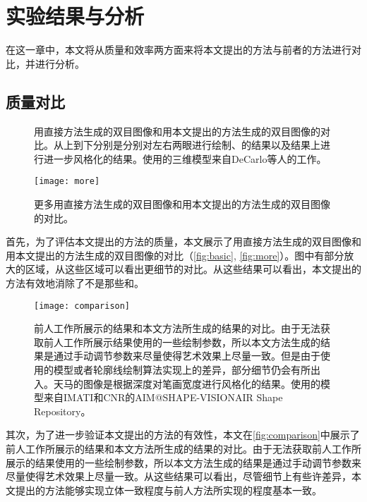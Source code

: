 \chapter{实验结果与分析}

在这一章中，本文将从质量和效率两方面来将本文提出的方法与前者的方法进行对比，并进行分析。

\section{质量对比}

\begin{figure}[tbh]
    \centering
    \caption{\label{fig:basic}
    用直接方法生成的双目图像和用本文提出的方法生成的双目图像的对比。从上到下分别是分别对左右两眼进行绘制、\stc{}的结果以及\stc{}结果上进行进一步风格化的结果。使用的三维模型来自DeCarlo等人的工作\cite{DFRS03}。
    }
\end{figure}
  
\begin{figure}[tbh]
    \centering
    \texttt{[image: more]}
    \caption{\label{fig:more}
    更多用直接方法生成的双目图像和用本文提出的方法生成的双目图像的对比。
    }
\end{figure}

首先，为了评估本文提出的方法的质量，本文展示了用直接方法生成的双目图像和用本文提出的方法生成的双目图像的对比（\autoref{fig:basic}, \autoref{fig:more}）。图中有部分放大的区域，从这些区域可以看出更细节的对比。从这些结果可以看出，本文提出的方法有效地消除了不是\stc{}那些\con{}和\scon{}。

\begin{figure}[tbh]
    \centering
    \texttt{[image: comparison]}
    \caption{\label{fig:comparison}
    前人工作\cite{kim2013stereoscopic,bukenberger2018stereo}所展示的结果和本文方法所生成的结果的对比。由于无法获取前人工作所展示结果使用的一些绘制参数，所以本文方法生成的结果是通过手动调节参数来尽量使得艺术效果上尽量一致。但是由于使用的模型或者轮廓线绘制算法实现上的差异，部分细节仍会有所出入。天马的图像是根据深度对笔画宽度进行风格化的结果。使用的模型来自IMATI和CNR的AIM@SHAPE-VISIONAIR Shape Repository\cite{INR04}。}
\end{figure}  

其次，为了进一步验证本文提出的方法的有效性，本文在\autoref{fig:comparison}中展示了前人工作\cite{kim2013stereoscopic,bukenberger2018stereo}所展示的结果和本文方法所生成的结果的对比。由于无法获取前人工作所展示的结果使用的一些绘制参数，所以本文方法生成的结果是通过手动调节参数来尽量使得艺术效果上尽量一致。从这些结果可以看出，尽管细节上有些许差异，本文提出的方法能够实现立体一致程度与前人方法所实现的程度基本一致。

